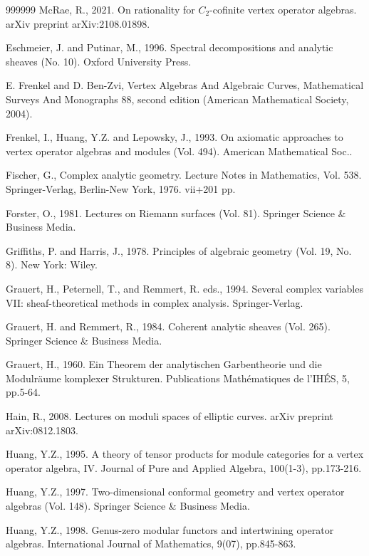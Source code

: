 \documentclass[12pt,b5paper,notitlepage]{report}
\theoremstyle{definition}
\theoremstyle{plain}
\numberwithin{equation}{section}
\begin{document}
\begin{thebibliography}{999999}
McRae, R., 2021. On rationality for $C_2$-cofinite vertex operator algebras. arXiv preprint arXiv:2108.01898.

Eschmeier, J. and Putinar, M., 1996. Spectral decompositions and analytic sheaves (No. 10). Oxford University Press.

E. Frenkel and D. Ben-Zvi, Vertex Algebras And Algebraic Curves, Mathematical Surveys And Monographs 88, second edition (American Mathematical Society, 2004).

Frenkel, I., Huang, Y.Z. and Lepowsky, J., 1993. On axiomatic approaches to vertex operator algebras and modules (Vol. 494). American Mathematical Soc..

Fischer, G., Complex analytic geometry. Lecture Notes in Mathematics, Vol. 538. Springer-Verlag, Berlin-New York, 1976. vii+201 pp.


Forster, O., 1981. Lectures on Riemann surfaces (Vol. 81). Springer Science \& Business Media.

Griffiths, P. and Harris, J., 1978. Principles of algebraic geometry (Vol. 19, No. 8). New York: Wiley.

Grauert, H., Peternell, T., and Remmert, R. eds., 1994. Several complex variables VII: sheaf-theoretical methods in complex analysis. Springer-Verlag.

Grauert, H. and Remmert, R., 1984. Coherent analytic sheaves (Vol. 265). Springer Science \& Business Media.

Grauert, H., 1960. Ein Theorem der analytischen Garbentheorie und die Modulr\"aume komplexer Strukturen. Publications Math\'ematiques de l'IH\'ES, 5, pp.5-64.

Hain, R., 2008. Lectures on moduli spaces of elliptic curves. arXiv preprint arXiv:0812.1803.

Huang, Y.Z., 1995. A theory of tensor products for module categories for a vertex operator algebra, IV. Journal of Pure and Applied Algebra, 100(1-3), pp.173-216.	

Huang, Y.Z., 1997. Two-dimensional conformal geometry and vertex operator algebras (Vol. 148). Springer Science \& Business Media.

Huang, Y.Z., 1998. Genus-zero modular functors and intertwining operator algebras. International Journal of Mathematics, 9(07), pp.845-863.		


\end{thebibliography}
\end{document}
